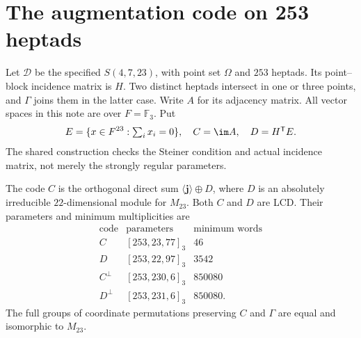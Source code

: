 \section{The augmentation code on 253 heptads}

Let $\mathcal D$ be the specified $S(4,7,23)$, with point set $\Omega$
and $253$ heptads. Its point--block incidence matrix is $H$.
Two distinct heptads intersect in one or three points, and $\Gamma$ joins
them in the latter case. Write $A$ for its adjacency matrix. All vector
spaces in this note are over $F=\mathbb F_3$. Put
\[
 E=\{x\in F^{23}:\textstyle\sum_i x_i=0\},\quad
 C=\im A,\quad D=H^{\mathsf T}E.
\]
The shared construction checks the Steiner condition and actual incidence
matrix, not merely the strongly regular parameters.

\begin{theorem}\label{L050.253}
The code $C$ is the orthogonal direct sum $\langle\mathbf j\rangle\oplus D$,
where $D$ is an absolutely irreducible $22$-dimensional module for $M_{23}$.
Both $C$ and $D$ are LCD. Their parameters and minimum multiplicities are
\[
\begin{array}{c|c|r}
\text{code}&\text{parameters}&\text{minimum words}\\\hline
C &[253,23,77]_3&46\\
D &[253,22,97]_3&3542\\
C^\perp &[253,230,6]_3&850080\\
D^\perp &[253,231,6]_3&850080.
\end{array}
\]
The full groups of coordinate permutations preserving $C$ and $\Gamma$
are equal and isomorphic to $M_{23}$.
\end{theorem}

